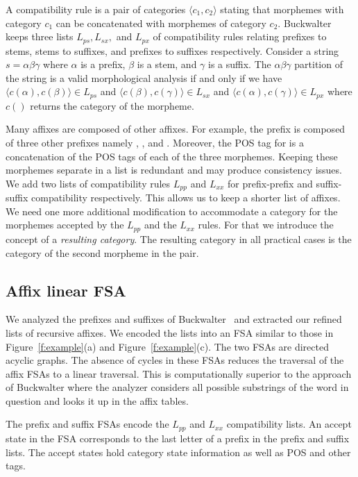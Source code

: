 \documentclass[11pt,letterpaper]{article}
\begin{document}
A compatibility rule is a pair of categories 
$\langle c_1, c_2\rangle$  stating that morphemes
with category $c_1$ can be concatenated with morphemes
of category $c_2$. 
Buckwalter keeps three lists $L_{ps}, L_{sx},$ and $L_{px}$ 
of compatibility rules relating
prefixes to stems, stems to suffixes, and prefixes to suffixes
respectively. 
Consider a string $s=\alpha\beta\gamma$ where $\alpha$ is 
a prefix, $\beta$ is a stem, and $\gamma$ is a suffix. 
The $\alpha\beta\gamma$ partition of the string is a 
valid morphological analysis if  and only if we have
$\langle c(\alpha),c(\beta)\rangle \in L_{ps}$ and
$\langle c(\beta),c(\gamma)\rangle \in L_{sx}$ and
$\langle c(\alpha),c(\gamma)\rangle \in L_{px}$ where
$c()$ returns the category of the morpheme.

Many affixes are composed of other affixes. For example,
the prefix  is composed of three other prefixes
namely , , and .
Moreover, the POS tag for  is a concatenation
of the POS tags of each of the three morphemes. 
Keeping these morphemes separate in a list
is redundant and may produce consistency issues. 
We add two lists of compatibility rules $L_{pp}$ and
$L_{xx}$ for prefix-prefix and suffix-suffix compatibility
respectively.
This allows us to keep a shorter list of affixes. 
We need one more additional modification to accommodate 
a category for the morphemes accepted by the $L_{pp}$
and the $L_{xx}$ rules. For that we introduce the concept
of a {\em resulting category}. 
The resulting category in all practical cases
is the category of the second morpheme in the pair. 

\subsection{Affix linear FSA}
\label{sec:affixFSA}

We analyzed the prefixes and suffixes of 
Buckwalter~
and extracted our refined lists of recursive affixes.
We encoded the lists into an FSA similar to those
in Figure~\ref{f:example}(a) and Figure~\ref{f:example}(c).
The two FSAs are directed acyclic graphs. 
The absence of cycles in these FSAs reduces the 
traversal of the affix FSAs to a linear traversal.
This is computationally superior to the 
approach of Buckwalter where the analyzer considers
all possible substrings of the word in question
and looks it up in the affix tables. 

The prefix and suffix FSAs encode the $L_{pp}$ and
$L_{xx}$ compatibility lists.
An accept state in the FSA corresponds to the last letter 
of a prefix in the prefix and suffix lists.
The accept states hold category state information as well
as POS and other tags.
\end{document}

